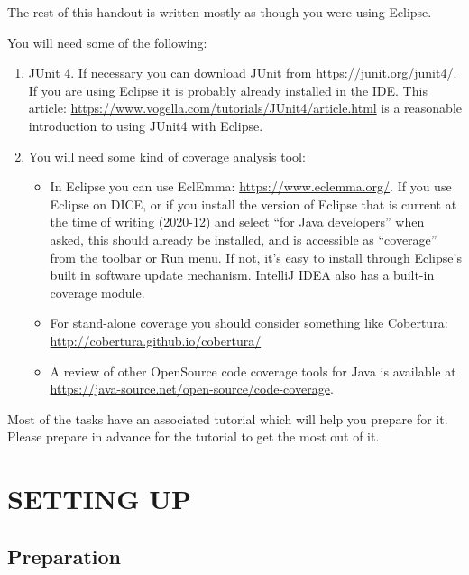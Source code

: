 \documentclass{article}
\begin{document}
The rest of this handout is written mostly as though you were using
Eclipse.

You will need some of the following:

\begin{enumerate}
\item JUnit 4. If necessary you can download JUnit from
  \url{https://junit.org/junit4/}. If you are using Eclipse it is
  probably already installed in the IDE. This article:
  \url{https://www.vogella.com/tutorials/JUnit4/article.html} is a
  reasonable introduction to using JUnit4 with Eclipse.
  
    \item You will need some kind of coverage analysis tool:
    \begin{itemize}
        \item In Eclipse you can use EclEmma:
          \url{https://www.eclemma.org/}. If you use Eclipse on DICE,
          or if you install the version of Eclipse that is current at
          the time of writing (2020-12) and select ``for Java
          developers'' when asked, this should already be installed,
          and is accessible as ``coverage'' from the toolbar or Run
          menu.  If not, it's easy to install through Eclipse's built
          in software update mechanism. IntelliJ IDEA also has a
          built-in coverage module.
        \item For stand-alone coverage you should consider something
          like Cobertura: \url{http://cobertura.github.io/cobertura/}
        \item A review of other OpenSource code coverage tools for
          Java is available at
          \url{https://java-source.net/open-source/code-coverage}.
    \end{itemize}
\end{enumerate}

Most of the tasks have an associated tutorial which will help you
prepare for it. Please prepare in advance for the tutorial to get the
most out of it.

\section{SETTING UP}

\subsection{Preparation}
\end{document}
